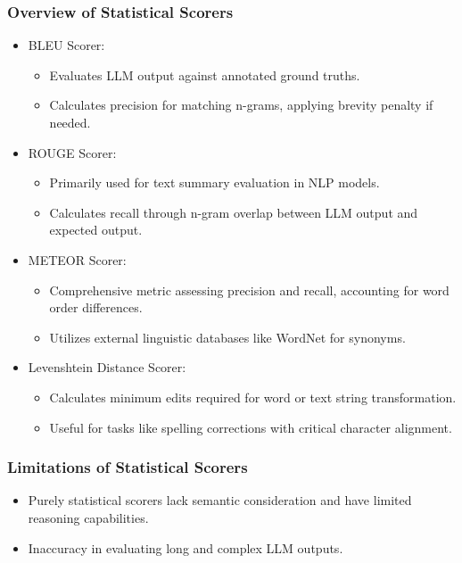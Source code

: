\begin{frame}[fragile]\frametitle{Overview of Statistical Scorers}
  \begin{itemize}
    \item BLEU Scorer:
      \begin{itemize}
        \item Evaluates LLM output against annotated ground truths.
        \item Calculates precision for matching n-grams, applying brevity penalty if needed.
      \end{itemize}
    \item ROUGE Scorer:
      \begin{itemize}
        \item Primarily used for text summary evaluation in NLP models.
        \item Calculates recall through n-gram overlap between LLM output and expected output.
      \end{itemize}
    \item METEOR Scorer:
      \begin{itemize}
        \item Comprehensive metric assessing precision and recall, accounting for word order differences.
        \item Utilizes external linguistic databases like WordNet for synonyms.
      \end{itemize}
    \item Levenshtein Distance Scorer:
      \begin{itemize}
        \item Calculates minimum edits required for word or text string transformation.
        \item Useful for tasks like spelling corrections with critical character alignment.
      \end{itemize}
  \end{itemize}
\end{frame}

\begin{frame}[fragile]\frametitle{Limitations of Statistical Scorers}
  \begin{itemize}
    \item Purely statistical scorers lack semantic consideration and have limited reasoning capabilities.
    \item Inaccuracy in evaluating long and complex LLM outputs.
  \end{itemize}
\end{frame}


